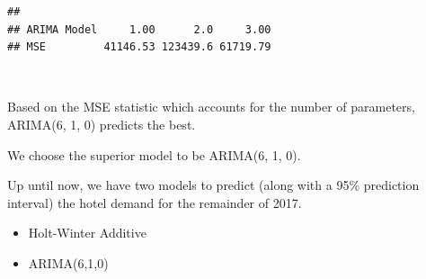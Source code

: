 \documentclass[]{article}
\newenvironment{Shaded}{\begin{snugshade}}{\end{snugshade}}
\newcommand{\DecValTok}[1]{\textcolor[rgb]{0.00,0.00,0.81}{#1}}
\newcommand{\FloatTok}[1]{\textcolor[rgb]{0.00,0.00,0.81}{#1}}
\newcommand{\KeywordTok}[1]{\textcolor[rgb]{0.13,0.29,0.53}{\textbf{#1}}}
\newcommand{\NormalTok}[1]{#1}
\newcommand{\OperatorTok}[1]{\textcolor[rgb]{0.81,0.36,0.00}{\textbf{#1}}}
\newcommand{\StringTok}[1]{\textcolor[rgb]{0.31,0.60,0.02}{#1}}
\providecommand{\tightlist}{%
  \setlength{\itemsep}{0pt}\setlength{\parskip}{0pt}}
\begin{document}
\begin{Shaded}
\end{Shaded}

\begin{verbatim}
##                                       
## ARIMA Model     1.00      2.0     3.00
## MSE         41146.53 123439.6 61719.79
\end{verbatim}

\(\;\)

Based on the MSE statistic which accounts for the number of parameters,
ARIMA(6, 1, 0) predicts the best.

We choose the superior model to be ARIMA(6, 1, 0).

Up until now, we have two models to predict (along with a 95\%
prediction interval) the hotel demand for the remainder of 2017.

\begin{itemize}
\tightlist
\item
  Holt-Winter Additive
\item
  ARIMA(6,1,0)
\end{itemize}
\end{document}
